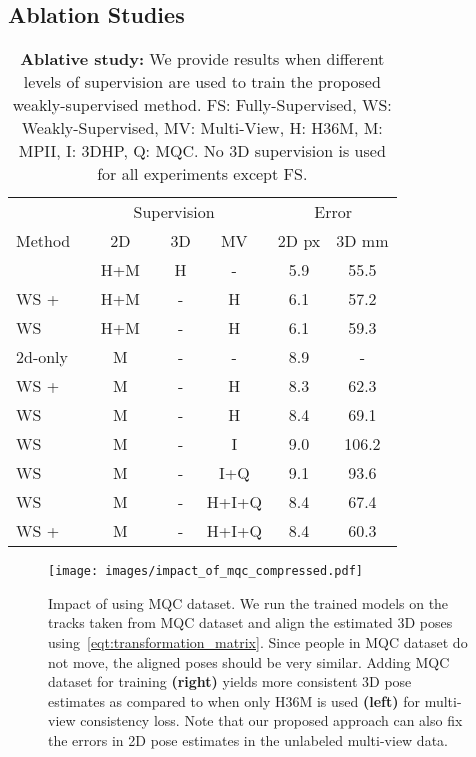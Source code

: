 \subsection{Ablation Studies}

\begin{table}[t]
\centering
\small
\begin{tabularx}{1\columnwidth}{X|ccc|c|c}
\toprule
 \multirow{3}{3cm}{Method} &  \multicolumn{3}{c|}{Supervision} & \multicolumn{2}{c}{Error}  \\
            & ~~~2D~~~  & 3D    & MV    &  2D  px  & 3D mm \\
\midrule
\midrule
FS          & H+M     & H     & -     &        5.9  & 55.5  \\ 
\midrule
WS +      & H+M     & -     & H     &       6.1    & 57.2\\ 
WS          & H+M     & -     & H     &       6.1    & 59.3   \\ 
\midrule
2d-only     & M         & -     & -     &       8.9        & - \\ 
WS +     & M         & -     & H     &       8.3        & 62.3 \\ 
WS          & M         & -     & H              &       8.4        & 69.1 \\ 
WS                  & M         & -     & I    &      9.0    & 106.2\\ 
WS                  & M         & -     & I+Q    &      9.1    & 93.6 \\ 
WS                   & M         & -    & H+I+Q  &       8.4    & 67.4 \\ 
WS +     & M         & -    & H+I+Q    &       8.4    & 60.3\\ 
\bottomrule
\end{tabularx}
\vspace{1mm}
\caption{\textbf{Ablative study:} We provide results when different levels of supervision are used to train the proposed weakly-supervised method. FS: Fully-Supervised, WS: Weakly-Supervised, MV: Multi-View, H: H36M, M: MPII, I: 3DHP, Q: MQC. No 3D supervision is used for all experiments except FS. \vspace{-3mm}}
\label{tab:ablation}

\end{table}

\begin{figure*}[t]
    \centering
    \texttt{[image: images/impact\_of\_mqc\_compressed.pdf]}
    \vspace{-5mm}
    \caption{Impact of using MQC dataset. We run the trained models on the tracks taken from MQC dataset and align the estimated 3D poses using~\eqref{eqt:transformation_matrix}. Since people in MQC dataset do not move, the aligned poses should be very similar. Adding MQC dataset for training \textbf{(right)} yields
more consistent 3D pose estimates as compared to when only H36M is used \textbf{(left)} for multi-view consistency loss. Note that our proposed approach can also fix the errors in 2D pose estimates in the unlabeled multi-view data. \vspace{-3mm}}
    \label{fig:impact_of_mqc}
\end{figure*}



